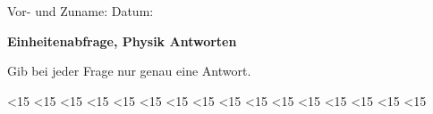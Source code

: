 \documentclass{./units4school}
\begin{document}
Vor- und Zuname: \raisebox{-2pt}{\rule[-.4ex]{5cm}{.4pt}}\hfill%
Datum: \raisebox{-2pt}{\rule[-.4ex]{3cm}{.4pt}}
\hspace*{.5cm}%


\vspace{6mm}
\textbf{\large Einheitenabfrage, Physik \ifprintanswers \hfill \textcolor{AccentColor}{Antworten}\fi
}%
\vspace{3mm}

Gib bei jeder Frage nur genau eine Antwort.








\ifnum\theexerciseID<15 {} \fi
\ifnum\theexerciseID<15 {} \fi
\ifnum\theexerciseID<15 {} \fi
\ifnum\theexerciseID<15 {} \fi
\ifnum\theexerciseID<15 {} \fi
\ifnum\theexerciseID<15 {} \fi
\ifnum\theexerciseID<15 {} \fi
\ifnum\theexerciseID<15 {} \fi
\ifnum\theexerciseID<15 {} \fi
\ifnum\theexerciseID<15 {} \fi
\ifnum\theexerciseID<15 {} \fi
\ifnum\theexerciseID<15 {} \fi
\ifnum\theexerciseID<15 {} \fi
\ifnum\theexerciseID<15 {} \fi
\ifnum\theexerciseID<15 {} \fi
%
\ifnum\theexerciseID<15 {} \fi
%
\end{document}
